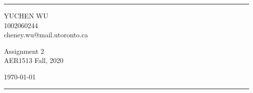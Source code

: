 \documentclass[a4paper]{article}
\begin{document}

\fancyhead[C]{}
\hrule \medskip %
\begin{minipage}{0.295\textwidth} 
\raggedright
\footnotesize
YUCHEN WU\hfill\\   
1002060244\hfill\\
cheney.wu@mail.utoronto.ca
\end{minipage}
\begin{minipage}{0.4\textwidth} 
\centering 
\large 
Assignment 2\\ 
\normalsize 
AER1513 Fall, 2020\\ 
\end{minipage}
\begin{minipage}{0.295\textwidth} 
\raggedleft
\today\hfill\\
\end{minipage}
\medskip\hrule 
\bigskip


\newcommand{\vect}[1]{\bm{\mathbf{#1}}}
\newcommand{\mat}[1]{\bm{\mathbf{#1}}}
\end{document}
